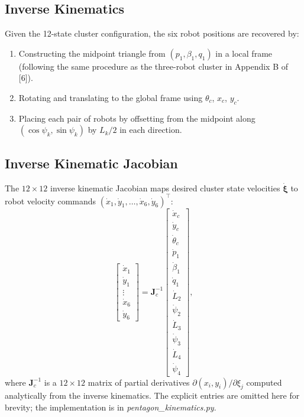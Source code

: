 \documentclass[lettersize,journal]{IEEEtran}
\begin{document}
\subsection{Inverse Kinematics}

Given the 12-state cluster configuration, the six robot positions are recovered
by:
\begin{enumerate}
    \item Constructing the midpoint triangle from $(p_1, \beta_1, q_1)$ in
          a local frame (following the same procedure as the three-robot
          cluster in Appendix B of [6]).
    \item Rotating and translating to the global frame using $\theta_c$,
          $x_c$, $y_c$.
    \item Placing each pair of robots by offsetting from the midpoint along
          $(\cos\psi_k, \sin\psi_k)$ by $L_k/2$ in each direction.
\end{enumerate}

\subsection{Inverse Kinematic Jacobian}

The $12 \times 12$ inverse kinematic Jacobian maps desired cluster state
velocities $\dot{\boldsymbol{\xi}}$ to robot velocity commands
$(\dot{x}_1, \dot{y}_1, \ldots, \dot{x}_6, \dot{y}_6)^\top$:
\begin{equation}
    \begin{bmatrix} \dot{x}_1 \\ \dot{y}_1 \\ \vdots \\
    \dot{x}_6 \\ \dot{y}_6 \end{bmatrix}
    =
    \mathbf{J}_c^{-1}
    \begin{bmatrix} \dot{x}_c \\ \dot{y}_c \\ \dot{\theta}_c \\
    \dot{p}_1 \\ \dot{\beta}_1 \\ \dot{q}_1 \\
    \dot{L}_2 \\ \dot{\psi}_2 \\ \dot{L}_3 \\ \dot{\psi}_3 \\
    \dot{L}_4 \\ \dot{\psi}_4 \end{bmatrix},
    \label{eq:inv_kin_jac}
\end{equation}
where $\mathbf{J}_c^{-1}$ is a $12 \times 12$ matrix of partial derivatives
$\partial (x_i, y_i) / \partial \xi_j$ computed analytically from the inverse
kinematics. The explicit entries are omitted here for brevity; the
implementation is in \textit{pentagon\_kinematics.py}.
\end{document}
